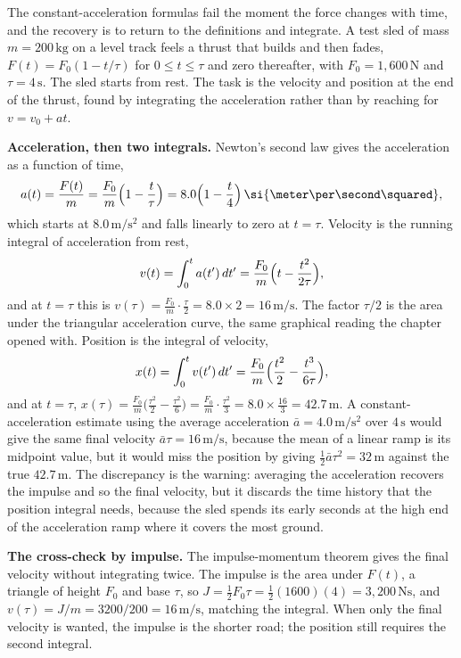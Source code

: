 The constant-acceleration formulas fail the moment the force changes
with time, and the recovery is to return to the definitions and
integrate. A test sled of mass $m=200\,\si{\kilogram}$ on a level track
feels a thrust that builds and then fades, $F(t)=F_{0}(1-t/\tau)$ for
$0\le t\le\tau$ and zero thereafter, with $F_{0}=1{,}600\,\si{\newton}$
and $\tau=4\,\si{\second}$. The sled starts from rest. The task is the
velocity and position at the end of the thrust, found by integrating
the acceleration rather than by reaching for $v=v_{0}+at$.

\textbf{Acceleration, then two integrals.} Newton's second law gives
the acceleration as a function of time,
\[
a(t)=\frac{F(t)}{m}=\frac{F_{0}}{m}\Bigl(1-\frac{t}{\tau}\Bigr)
=8.0\Bigl(1-\frac{t}{4}\Bigr)\,\si{\meter\per\second\squared},
\]
which starts at $8.0\,\si{\meter\per\second\squared}$ and falls
linearly to zero at $t=\tau$. Velocity is the running integral of
acceleration from rest,
\[
v(t)=\int_{0}^{t}a(t')\,dt'=\frac{F_{0}}{m}\Bigl(t-\frac{t^{2}}{2\tau}
\Bigr),
\]
and at $t=\tau$ this is $v(\tau)=\frac{F_{0}}{m}\cdot\frac{\tau}{2}=
8.0\times 2=16\,\si{\meter\per\second}$. The factor $\tau/2$ is the
area under the triangular acceleration curve, the same graphical
reading the chapter opened with. Position is the integral of velocity,
\[
x(t)=\int_{0}^{t}v(t')\,dt'=\frac{F_{0}}{m}\Bigl(\frac{t^{2}}{2}
-\frac{t^{3}}{6\tau}\Bigr),
\]
and at $t=\tau$, $x(\tau)=\frac{F_{0}}{m}\bigl(\frac{\tau^{2}}{2}-
\frac{\tau^{2}}{6}\bigr)=\frac{F_{0}}{m}\cdot\frac{\tau^{2}}{3}=8.0
\times\frac{16}{3}=42.7\,\si{\meter}$. A constant-acceleration estimate
using the average acceleration $\bar{a}=4.0\,\si{\meter\per\second
\squared}$ over $4\,\si{\second}$ would give the same final velocity
$\bar{a}\tau=16\,\si{\meter\per\second}$, because the mean of a linear
ramp is its midpoint value, but it would miss the position by giving
$\tfrac{1}{2}\bar{a}\tau^{2}=32\,\si{\meter}$ against the true
$42.7\,\si{\meter}$. The discrepancy is the warning: averaging the
acceleration recovers the impulse and so the final velocity, but it
discards the time history that the position integral needs, because the
sled spends its early seconds at the high end of the acceleration ramp
where it covers the most ground.

\textbf{The cross-check by impulse.} The impulse-momentum theorem gives
the final velocity without integrating twice. The impulse is the area
under $F(t)$, a triangle of height $F_{0}$ and base $\tau$, so
$J=\tfrac{1}{2}F_{0}\tau=\tfrac{1}{2}(1600)(4)=3{,}200\,\si{\newton
\second}$, and $v(\tau)=J/m=3200/200=16\,\si{\meter\per\second}$,
matching the integral. When only the final velocity is wanted, the
impulse is the shorter road; the position still requires the second
integral.


